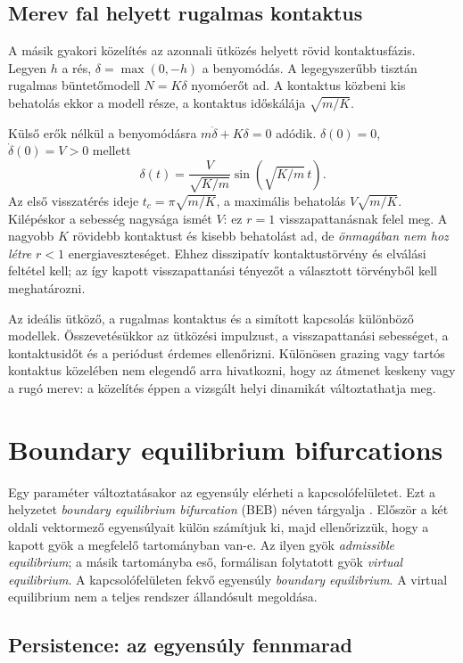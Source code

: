 \subsection{Merev fal helyett rugalmas kontaktus}
\examplebody

A másik gyakori közelítés az azonnali ütközés helyett rövid kontaktusfázis. Legyen $h$ a rés, $\delta=\max(0,-h)$ a benyomódás. A legegyszerűbb tisztán rugalmas büntetőmodell $N=K\delta$ nyomóerőt ad. A kontaktus közbeni kis behatolás ekkor a modell része, a kontaktus időskálája $\sqrt{m/K}$.

Külső erők nélkül a benyomódásra $m\ddot\delta+K\delta=0$ adódik. $\delta(0)=0$, $\dot\delta(0)=V>0$ mellett
\[
\delta(t)=\frac{V}{\sqrt{K/m}}\sin\!\left(\sqrt{K/m}\,t\right).
\]
Az első visszatérés ideje $t_c=\pi\sqrt{m/K}$, a maximális behatolás $V\sqrt{m/K}$. Kilépéskor a sebesség nagysága ismét $V$: ez $r=1$ visszapattanásnak felel meg. A nagyobb $K$ rövidebb kontaktust és kisebb behatolást ad, de \emph{önmagában nem hoz létre} $r<1$ energiaveszteséget. Ehhez disszipatív kontaktustörvény és elválási feltétel kell; az így kapott visszapattanási tényezőt a választott törvényből kell meghatározni.

Az ideális ütköző, a rugalmas kontaktus és a simított kapcsolás különböző modellek. Összevetésükkor az ütközési impulzust, a visszapattanási sebességet, a kontaktusidőt és a periódust érdemes ellenőrizni. Különösen grazing vagy tartós kontaktus közelében nem elegendő arra hivatkozni, hogy az átmenet keskeny vagy a rugó merev: a közelítés éppen a vizsgált helyi dinamikát változtathatja meg.
\exampleend

\section{Boundary equilibrium bifurcations}\label{sec:beb}
Egy paraméter változtatásakor az egyensúly elérheti a kapcsolófelületet. Ezt a helyzetet \emph{boundary equilibrium bifurcation} (BEB) néven tárgyalja \cite[5.1--5.2. szakasz]{dib}. Először a két oldali vektormező egyensúlyait külön számítjuk ki, majd ellenőrizzük, hogy a kapott gyök a megfelelő tartományban van-e. Az ilyen gyök \emph{admissible equilibrium}; a másik tartományba eső, formálisan folytatott gyök \emph{virtual equilibrium}. A kapcsolófelületen fekvő egyensúly \emph{boundary equilibrium}. A virtual equilibrium nem a teljes rendszer állandósult megoldása.

\subsection{Persistence: az egyensúly fennmarad}
\examplebody

